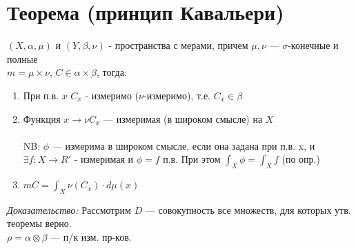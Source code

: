 \documentclass[paper=a4, fontsize=17pt]{article}
\begin{document}
\section{Теорема (принцип Кавальери)}
	$(X, \alpha, \mu)$ и $(Y, \beta, \nu)$ - пространства с мерами, причем $\mu , \nu$ --- $\sigma$-конечные и полные\\
	$m = \mu \times \nu$, $C \in \alpha\times\beta$, тогда:\\
	\begin{enumerate}
		\item
		При п.в. $x$ $C_x$ - измеримо ($\nu$-измеримо), т.е. $C_x \in \beta$ 
		\item
		Функция $x \rightarrow \nu C_x$ --- измеримая (в широком смысле) на $X$\\ \\
		NB: $\phi$ --- измерима в широком смысле, если она задана при п.в. x, и $\exists f : X \rightarrow R'$ - измеримая и $\phi = f$ п.в. При этом $\int_X \phi = \int_X f$ (по опр.)
		\item
		$m C = \int_X \nu(C_x) \cdot d\mu(x)$
	\end{enumerate}
	\emph{Доказательство: } 
		Рассмотрим $D$ --- совокупность все множеств, для которых утв. теоремы верно.\\
		$\rho = \alpha\otimes\beta$ --- п/к изм. пр-ков.\\
\end{document}
